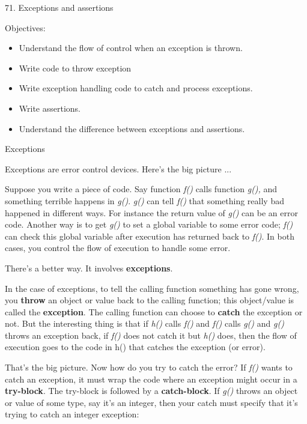 \documentclass[
]{article}
\author{}
\date{}
\providecommand{\tightlist}{%
  \setlength{\itemsep}{0pt}\setlength{\parskip}{0pt}}
\begin{document}
71. Exceptions and assertions

Objectives:

\begin{itemize}
\tightlist
\item
  Understand the flow of control when an exception is thrown.
\item
  Write code to throw exception
\item
  Write exception handling code to catch and process exceptions.
\item
  Write assertions.
\item
  Understand the difference between exceptions and assertions.
\end{itemize}

Exceptions

Exceptions are error control devices. Here's the big picture ...

Suppose you write a piece of code. Say function \emph{f()} calls
function \emph{g(),} and something terrible happens in \emph{g()}.
\emph{g()} can tell \emph{f()} that something really bad happened in
different ways. For instance the return value of \emph{g()} can be an
error code. Another way is to get \emph{g()} to set a global variable to
some error code; \emph{f()} can check this global variable after
execution has returned back to \emph{f()}. In both cases, you control
the flow of execution to handle some error.

There's a better way. It involves \textbf{exceptions}.

In the case of exceptions, to tell the calling function something has
gone wrong, you \textbf{throw} an object or value back to the calling
function; this object/value is called the \textbf{exception}. The
calling function can choose to \textbf{catch} the exception or not. But
the interesting thing is that if \emph{h()} calls \emph{f()} and
\emph{f()} calls \emph{g()} and \emph{g()} throws an exception back, if
\emph{f()} does not catch it but \emph{h()} does, then the flow of
execution goes to the code in h() that catches the exception (or error).

That's the big picture. Now how do you try to catch the error? If
\emph{f()} wants to catch an exception, it must wrap the code where an
exception might occur in a \textbf{try-block}. The try-block is followed
by a \textbf{catch-block}. If \emph{g()} throws an object or value of
some type, say it's an integer, then your catch must specify that it's
trying to catch an integer exception:
\end{document}
